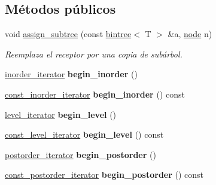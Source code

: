 \subsection*{Métodos públicos}
\begin{DoxyCompactItemize}
\item 
void \hyperlink{classbintree_ab5fb2e54f418de017ba23a2b7084e67e}{assign\+\_\+subtree} (const \hyperlink{classbintree}{bintree}$<$ T $>$ \&a, \hyperlink{classbintree_1_1node}{node} n)
\begin{DoxyCompactList}\small\item\em Reemplaza el receptor por una copia de subárbol. \end{DoxyCompactList}\item 
\hypertarget{classbintree_af24d2fffd7aea66b878f214b906cb4aa}{}\hyperlink{classbintree_1_1inorder__iterator}{inorder\+\_\+iterator} {\bfseries begin\+\_\+inorder} ()\label{classbintree_af24d2fffd7aea66b878f214b906cb4aa}

\item 
\hypertarget{classbintree_a7285974b783b29b0d10afefcd5658009}{}\hyperlink{classbintree_1_1const__inorder__iterator}{const\+\_\+inorder\+\_\+iterator} {\bfseries begin\+\_\+inorder} () const \label{classbintree_a7285974b783b29b0d10afefcd5658009}

\item 
\hypertarget{classbintree_ab806982263f4c480797e3addb07d9724}{}\hyperlink{classbintree_1_1level__iterator}{level\+\_\+iterator} {\bfseries begin\+\_\+level} ()\label{classbintree_ab806982263f4c480797e3addb07d9724}

\item 
\hypertarget{classbintree_a294c19f33a55a82e0a535a8a3cc9eb0a}{}\hyperlink{classbintree_1_1const__level__iterator}{const\+\_\+level\+\_\+iterator} {\bfseries begin\+\_\+level} () const \label{classbintree_a294c19f33a55a82e0a535a8a3cc9eb0a}

\item 
\hypertarget{classbintree_a2e98e109ca6c2ac9649769e2e32dbae9}{}\hyperlink{classbintree_1_1postorder__iterator}{postorder\+\_\+iterator} {\bfseries begin\+\_\+postorder} ()\label{classbintree_a2e98e109ca6c2ac9649769e2e32dbae9}

\item 
\hypertarget{classbintree_abd8fb69e96f1326b8d1745ccd1833352}{}\hyperlink{classbintree_1_1const__postorder__iterator}{const\+\_\+postorder\+\_\+iterator} {\bfseries begin\+\_\+postorder} () const \label{classbintree_abd8fb69e96f1326b8d1745ccd1833352}


\end{DoxyCompactItemize}
